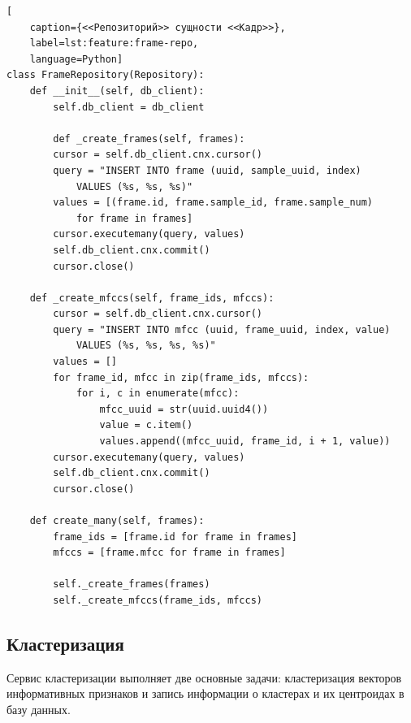 \begin{lstlisting}[
	caption={<<Репозиторий>> сущности <<Кадр>>},
	label=lst:feature:frame-repo,
	language=Python]
class FrameRepository(Repository):
    def __init__(self, db_client):
        self.db_client = db_client

        def _create_frames(self, frames):
        cursor = self.db_client.cnx.cursor()
        query = "INSERT INTO frame (uuid, sample_uuid, index)
			VALUES (%s, %s, %s)"
        values = [(frame.id, frame.sample_id, frame.sample_num)
			for frame in frames]
        cursor.executemany(query, values)
        self.db_client.cnx.commit()
        cursor.close()

    def _create_mfccs(self, frame_ids, mfccs):
        cursor = self.db_client.cnx.cursor()
        query = "INSERT INTO mfcc (uuid, frame_uuid, index, value)
			VALUES (%s, %s, %s, %s)"
        values = []
        for frame_id, mfcc in zip(frame_ids, mfccs):
            for i, c in enumerate(mfcc):
                mfcc_uuid = str(uuid.uuid4())
                value = c.item()
                values.append((mfcc_uuid, frame_id, i + 1, value))
        cursor.executemany(query, values)
        self.db_client.cnx.commit()
        cursor.close()

    def create_many(self, frames):
        frame_ids = [frame.id for frame in frames]
        mfccs = [frame.mfcc for frame in frames]

        self._create_frames(frames)
        self._create_mfccs(frame_ids, mfccs)
\end{lstlisting}

\subsection{Кластеризация}
Сервис кластеризации выполняет две основные задачи: кластеризация векторов информативных признаков и запись информации о кластерах и их центроидах в базу данных.

